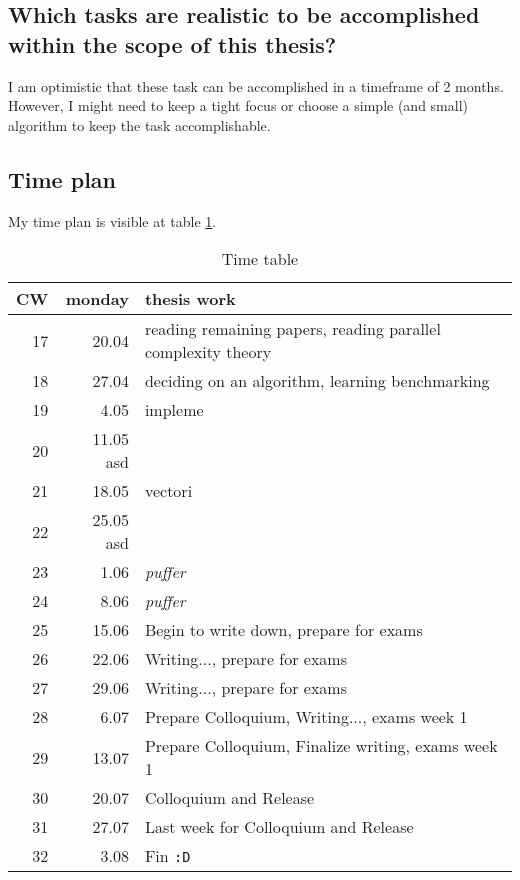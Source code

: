 \message{ !name(expose.tex)}\documentclass{article}
\begin{document}
    \subsection{Which tasks are realistic to be accomplished within the scope of this thesis?}
    I am optimistic that these task can be accomplished in a timeframe of 2 months. However, I might need to keep a tight focus or
    choose a simple (and small) algorithm to keep the task accomplishable.

    \subsection{Time plan}
    My time plan is visible at table \ref{timetable}.
    \begin{table}[h]
        \begin{center}
        \caption{Time table} %
        \label{timetable}
        \begin{tabular}{rrl}
            \toprule
            CW & monday & thesis work \\
            \midrule
            17 & 20.04 & reading remaining papers, reading parallel complexity theory \\
            18 & 27.04 & deciding on an algorithm, learning benchmarking  \\
            19 & 4.05  & impleme \\
            20 & 11.05  asd \\
            21 & 18.05 & vectori \\
            22 & 25.05 asd \\
            23 & 1.06  & \textit{puffer} \\
            24 & 8.06  & \textit{puffer} \\
            25 & 15.06 & Begin to write down, prepare for exams\\
            26 & 22.06 & Writing..., prepare for exams \\
            27 & 29.06 & Writing..., prepare for exams \\
            28 & 6.07  & Prepare Colloquium, Writing..., exams week 1 \\
            29 & 13.07 & Prepare Colloquium, Finalize writing, exams week 1 \\
            30 & 20.07 & Colloquium and Release \\
            31 & 27.07 & Last week for Colloquium and Release \\
            32 & 3.08  & Fin \texttt{:D} \\
        \end{tabular}
        \end{center}
    \end{table}
\end{document}
